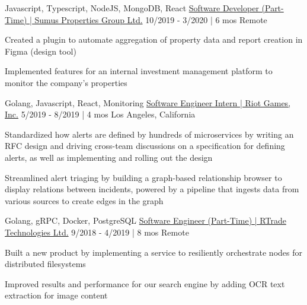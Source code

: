\begin{cventries}
  \cventry
    {Javascript, Typescript, NodeJS, MongoDB, React} %
    {\href{https://bobheadxi.dev/experience/sumus}{Software Developer (Part-Time) | Sumus Properties Group Ltd.}} %
    {10/2019 - 3/2020 | 6 mos} %
    {Remote} %
    {
      \begin{cvitems} %
        \item {Created a plugin to automate aggregation of property data and report creation in Figma (design tool)}
        \item {Implemented features for an internal investment management platform to monitor the company's properties}
      \end{cvitems}
    }


  \cventry
    {Golang, Javascript, React, Monitoring} %
    {\href{https://bobheadxi.dev/experience/riot-games}{Software Engineer Intern | Riot Games, Inc.}} %
    {5/2019 - 8/2019 | 4 mos} %
    {Los Angeles, California} %
    {
      \begin{cvitems} %
        \item {Standardized how alerts are defined by hundreds of microservices by writing an RFC design and driving cross-team discussions on a specification for defining alerts, as well as implementing and rolling out the design}
        \item {Streamlined alert triaging by building a graph-based relationship browser to display relations between incidents, powered by a pipeline that ingests data from various sources to create edges in the graph}
      \end{cvitems}
    }

  \cventry
    {Golang, gRPC, Docker, PostgreSQL} %
    {\href{https://bobheadxi.dev/experience/rtrade}{Software Engineer (Part-Time) | RTrade Technologies Ltd.}} %
    {9/2018 - 4/2019 | 8 mos} %
    {Remote} %
    {
      \begin{cvitems} %
        \item {Built a new product by implementing a service to resiliently orchestrate nodes for distributed filesystems}
        \item {Improved results and performance for our search engine by adding OCR text extraction for image content}
      \end{cvitems}
    }


\end{cventries}
